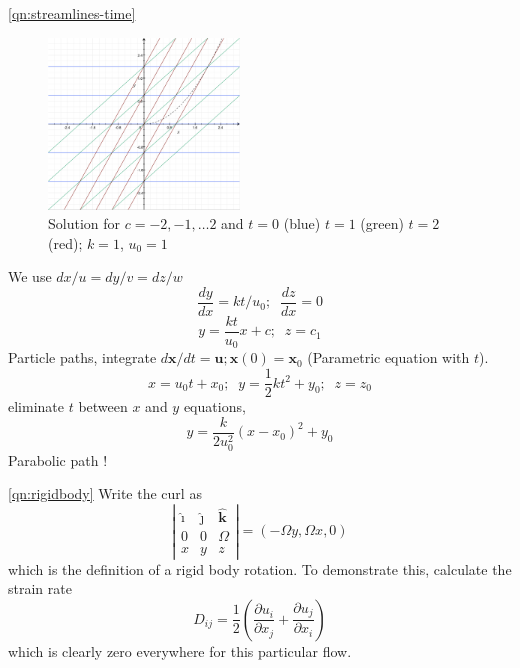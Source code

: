 \documentclass[10pt]{report}
\begin{document}
\begin{answer1}
\begin{questionnumber}{\ref{qn:streamlines-time}}
	\begin{figure}
	\includegraphics[width=2.0in]{ExercisesCh1-Q2-plot}
	\caption*{ Solution for $c=-2, -1, \ldots 2$ and $t=0$ (blue) $t=1$ (green) $t=2$ (red); $k=1$, $u_{0}=1$ }
	\end{figure}

	We use ${dx}/{u} = {dy}/{v} = {dz}/{w}$
	\[
	 \frac{dy}{dx} = kt/u_{0}; \;\; \frac{dz}{dx}=0
	\]
	\[
	y = \frac{kt}{u_{0}}x + c; \;\; z= c_{1}
	\]
	Particle paths, integrate $d{\bm x}/dt = {\bm u}; {\bm x}(0) = {\bm x}_{0}$ (Parametric equation with $t$).
	\[
	x = u_{0}t + x_{0}; \;\; y = \frac{1}{2}kt^{2} + y_{0}; \;\; z=z_{0}
	\]
	eliminate $t$ between $x$ and $y$ equations,
	\[
	 y = \frac{k}{2 u_{0}^{2}}(x-x_{0})^{2} + y_{0}
	\]
	Parabolic path !
\end{questionnumber}

\pagebreak[4]

\begin{questionnumber}{\ref{qn:rigidbody}}
	Write the curl as
	\[
		\left|\begin{array}{ccc}\hat{\bm \imath} & \hat{\bm \jmath} & \hat{\bm k} \\0 & 0 &
			\Omega \\ x & y & z\end{array}\right| = ( -\Omega y, \Omega x, 0 )
	\]
	which is the definition of a rigid body rotation.
	To demonstrate this, calculate the strain rate
	\[
	D_{ij} = \frac{1}{2} \left( \frac{\partial u_{i}}{\partial x_{j}} +  \frac{\partial u_{j}}{\partial x_{i}} \right)
	\]
	which is clearly zero everywhere for this particular flow.
\end{questionnumber}


\end{answer1}
\end{document}
